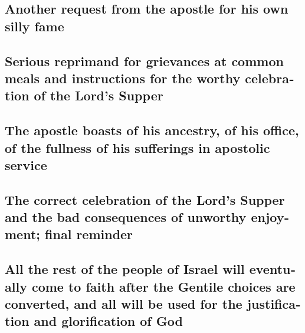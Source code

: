 \begin{paracol}{2}
\begin{otherlanguage}{english}
\hypertarget{another-request-from-the-apostle-for-his-own-silly-fame}{%
\subsection{Another request from the apostle for his own silly
fame}\label{another-request-from-the-apostle-for-his-own-silly-fame}}

\hypertarget{serious-reprimand-for-grievances-at-common-meals-and-instructions-for-the-worthy-celebration-of-the-lords-supper}{%
\subsection{Serious reprimand for grievances at common meals and
instructions for the worthy celebration of the Lord's
Supper}\label{serious-reprimand-for-grievances-at-common-meals-and-instructions-for-the-worthy-celebration-of-the-lords-supper}}

\hypertarget{the-apostle-boasts-of-his-ancestry-of-his-office-of-the-fullness-of-his-sufferings-in-apostolic-service}{%
\subsection{The apostle boasts of his ancestry, of his office, of the
fullness of his sufferings in apostolic
service}\label{the-apostle-boasts-of-his-ancestry-of-his-office-of-the-fullness-of-his-sufferings-in-apostolic-service}}

\hypertarget{the-correct-celebration-of-the-lords-supper-and-the-bad-consequences-of-unworthy-enjoyment-final-reminder}{%
\subsection{The correct celebration of the Lord's Supper and the bad
consequences of unworthy enjoyment; final
reminder}\label{the-correct-celebration-of-the-lords-supper-and-the-bad-consequences-of-unworthy-enjoyment-final-reminder}}

\hypertarget{all-the-rest-of-the-people-of-israel-will-eventually-come-to-faith-after-the-gentile-choices-are-converted-and-all-will-be-used-for-the-justification-and-glorification-of-god}{%
\subsection{All the rest of the people of Israel will eventually come to
faith after the Gentile choices are converted, and all will be used for
the justification and glorification of
God}\label{all-the-rest-of-the-people-of-israel-will-eventually-come-to-faith-after-the-gentile-choices-are-converted-and-all-will-be-used-for-the-justification-and-glorification-of-god}}


\end{otherlanguage}
\end{paracol}
